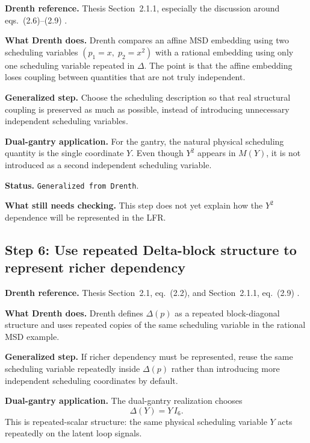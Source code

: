 ﻿\documentclass[11pt]{article}
\newcommand{\audititem}[2]{\par\smallskip\noindent\textbf{#1.} #2\par}
\newcommand{\statusline}[1]{\texttt{#1}}
\begin{document}
\audititem{Drenth reference}{Thesis Section~2.1.1, especially the discussion
around eqs.~(2.6)--(2.9) \cite{drenth2025thesis}.}

\audititem{What Drenth does}{Drenth compares an affine MSD embedding using two
scheduling variables $(p_1=x,\; p_2=x^2)$ with a rational embedding using only
one scheduling variable repeated in $\Delta$. The point is that the affine
embedding loses coupling between quantities that are not truly independent.}

\audititem{Generalized step}{Choose the scheduling description so that real
structural coupling is preserved as much as possible, instead of introducing
unnecessary independent scheduling variables.}

\audititem{Dual-gantry application}{For the gantry, the natural physical
scheduling quantity is the single coordinate $Y$. Even though $Y^2$ appears in
$M(Y)$, it is not introduced as a second independent scheduling variable.}

\audititem{Status}{\statusline{Generalized from Drenth}.}

\audititem{What still needs checking}{This step does not yet explain how the
$Y^2$ dependence will be represented in the LFR.}

\subsection{Step 6: Use repeated Delta-block structure to represent richer dependency}

\audititem{Drenth reference}{Thesis Section~2.1, eq.~(2.2), and Section~2.1.1,
eq.~(2.9) \cite{drenth2025thesis}.}

\audititem{What Drenth does}{Drenth defines $\Delta(p)$ as a repeated
block-diagonal structure and uses repeated copies of the same scheduling
variable in the rational MSD example.}

\audititem{Generalized step}{If richer dependency must be represented, reuse the
same scheduling variable repeatedly inside $\Delta(p)$ rather than introducing
more independent scheduling coordinates by default.}

\audititem{Dual-gantry application}{The dual-gantry realization chooses
\begin{equation}
    \Delta(Y) = Y\,I_6.
    \label{eqv:Delta}
\end{equation}
This is repeated-scalar structure: the same physical scheduling variable $Y$
acts repeatedly on the latent loop signals.}
\end{document}
